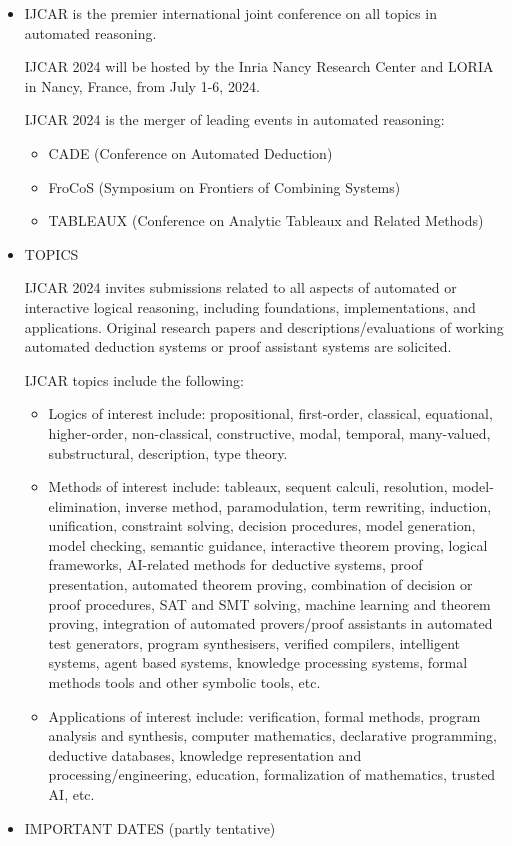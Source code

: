 \documentclass[prodmode,acmtecs]{acmsmall} %
\begin{document}
\begin{itemize}\item  IJCAR is the premier international joint conference on all topics in automated reasoning.  
 
  IJCAR 2024 will be hosted by the Inria Nancy Research Center and LORIA in Nancy, France, from July 1-6, 2024. 
 
  IJCAR 2024 is the merger of leading events in automated reasoning: 
 
\begin{itemize}\item  CADE (Conference on Automated Deduction)
\item  FroCoS (Symposium on Frontiers of Combining Systems)
\item  TABLEAUX (Conference on Analytic Tableaux and Related Methods)
\end{itemize} 
\item  TOPICS 
 
  IJCAR 2024 invites submissions related to all aspects of automated or interactive logical reasoning, including foundations, implementations, and applications. Original research papers and descriptions/evaluations of working automated deduction systems or proof assistant systems are solicited.  
 
  IJCAR topics include the following: 
 
\begin{itemize}\item  Logics of interest include: propositional, first-order, classical, equational, higher-order, non-classical, constructive, modal, temporal, many-valued, substructural, description, type theory.
\item  Methods of interest include: tableaux, sequent calculi, resolution, model-elimination, inverse method, paramodulation, term rewriting, induction, unification, constraint solving, decision procedures, model generation, model checking, semantic guidance, interactive theorem proving, logical frameworks, AI-related methods for deductive systems, proof presentation, automated theorem proving, combination of decision or proof procedures, SAT and SMT solving, machine learning and theorem proving, integration of automated provers/proof assistants in automated test generators, program synthesisers, verified compilers, intelligent systems, agent based systems, knowledge processing systems, formal methods tools and other symbolic tools, etc.
\item  Applications of interest include: verification, formal methods, program analysis and synthesis, computer mathematics, declarative programming, deductive databases, knowledge representation and processing/engineering, education, formalization of mathematics, trusted AI, etc.
\end{itemize} 
\item  IMPORTANT DATES (partly tentative) 
 

\end{itemize}
\end{document}
